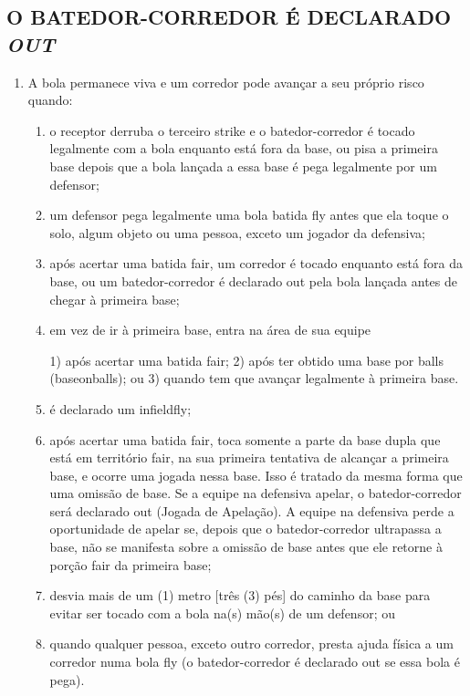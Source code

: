 \subsection{O BATEDOR-CORREDOR É DECLARADO \textit{OUT}}
	\begin{enumerate}[label=(\alph*)]
		\item   A bola permanece viva e um corredor pode avançar a seu próprio risco quando:
		\begin{enumerate}[label=\roman*.]
			\item o receptor derruba o terceiro \gls{strike} e o batedor-corredor é tocado legalmente com a bola enquanto está fora da base, ou pisa a primeira base depois que a  bola lançada a essa base é pega legalmente por um defensor;
			\item um defensor pega legalmente uma bola batida \gls{fly} antes que ela toque o solo, algum objeto ou uma pessoa, exceto um jogador da defensiva;
			\item após acertar uma batida \gls{fair}, um corredor é tocado enquanto está fora da base, ou um batedor-corredor é declarado \gls{out} pela bola lançada antes de chegar à primeira base;
			\item em vez de ir à primeira base, entra na área de sua equipe

			 1) após acertar uma batida \gls{fair};
			 2) após ter obtido uma base por \glspl{ball} (\gls{baseonballs}); ou
			 3) quando tem que avançar legalmente à primeira base.

			\item  é declarado um \gls{infieldfly};
			\item  após acertar uma batida \gls{fair}, toca somente a parte da base dupla que está em território \gls{fair}, na sua primeira tentativa de alcançar a primeira base, e ocorre uma jogada nessa base. Isso é tratado da mesma forma que uma omissão de base. Se a equipe na defensiva apelar, o batedor-corredor será declarado \gls{out} (Jogada de Apelação). A equipe na defensiva perde a oportunidade de apelar se, depois que o batedor-corredor ultrapassa a base, não se manifesta sobre a omissão de base antes que ele retorne à porção \gls{fair} da primeira base;
			\item  desvia mais de um (1) metro [três (3) pés] do caminho da base para evitar ser tocado com a bola na(s) mão(s) de um defensor; ou
			\item  quando qualquer pessoa, exceto outro corredor, presta ajuda física a um corredor numa bola \gls{fly} (o batedor-corredor é declarado \gls{out} se essa bola é pega).
		\end{enumerate}


\end{enumerate}
